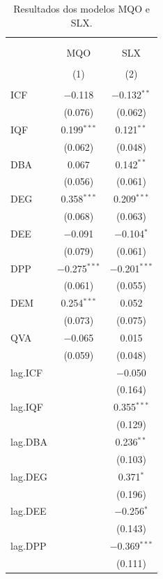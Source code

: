\documentclass[a4paper,12pt]{article}
\begin{document}
\newpage

\hypertarget{tbl-slx}{}
\begin{table}[!htbp] \centering 
  \caption{\label{tbl-slx}Resultados dos modelos MQO e SLX. } 
  \label{} 
\small 
\begin{tabular}{@{\extracolsep{5pt}}lcc} 
\\[-1.8ex]\hline 
\hline \\[-1.8ex] 
\\[-1.8ex] & MQO & SLX \\ 
\\[-1.8ex] & (1) & (2)\\ 
\hline \\[-1.8ex] 
 ICF & $-$0.118 & $-$0.132$^{**}$ \\ 
  & (0.076) & (0.062) \\ 
  IQF & 0.199$^{***}$ & 0.121$^{**}$ \\ 
  & (0.062) & (0.048) \\ 
  DBA & 0.067 & 0.142$^{**}$ \\ 
  & (0.056) & (0.061) \\ 
  DEG & 0.358$^{***}$ & 0.209$^{***}$ \\ 
  & (0.068) & (0.063) \\ 
  DEE & $-$0.091 & $-$0.104$^{*}$ \\ 
  & (0.079) & (0.061) \\ 
  DPP & $-$0.275$^{***}$ & $-$0.201$^{***}$ \\ 
  & (0.061) & (0.055) \\ 
  DEM & 0.254$^{***}$ & 0.052 \\ 
  & (0.073) & (0.075) \\ 
  QVA & $-$0.065 & 0.015 \\ 
  & (0.059) & (0.048) \\ 
  lag.ICF &  & $-$0.050 \\ 
  &  & (0.164) \\ 
  lag.IQF &  & 0.355$^{***}$ \\ 
  &  & (0.129) \\ 
  lag.DBA &  & 0.236$^{**}$ \\ 
  &  & (0.103) \\ 
  lag.DEG &  & 0.371$^{*}$ \\ 
  &  & (0.196) \\ 
  lag.DEE &  & $-$0.256$^{*}$ \\ 
  &  & (0.143) \\ 
  lag.DPP &  & $-$0.369$^{***}$ \\ 
  &  & (0.111) \\ 

\end{tabular}
\end{table}
\end{document}
